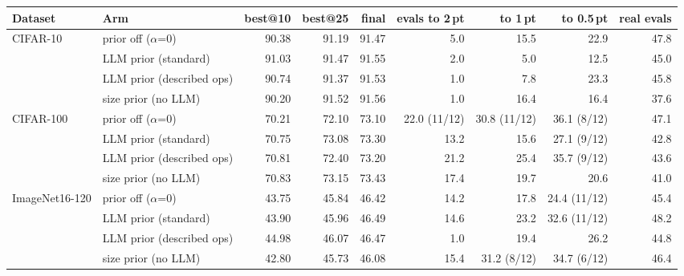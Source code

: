 \begin{tabular}{@{}llrrrrrrr@{}}
\toprule
Dataset & Arm & best@10 & best@25 & final & evals to 2\,pt & to 1\,pt & to 0.5\,pt & real evals\\
\midrule
CIFAR-10 & prior off ($\alpha$=0) & 90.38 & 91.19 & 91.47 & 5.0 & 15.5 & 22.9 & 47.8\\
 & LLM prior (standard) & 91.03 & 91.47 & 91.55 & 2.0 & 5.0 & 12.5 & 45.0\\
 & LLM prior (described ops) & 90.74 & 91.37 & 91.53 & 1.0 & 7.8 & 23.3 & 45.8\\
 & size prior (no LLM) & 90.20 & 91.52 & 91.56 & 1.0 & 16.4 & 16.4 & 37.6\\
\midrule
CIFAR-100 & prior off ($\alpha$=0) & 70.21 & 72.10 & 73.10 & 22.0 (11/12) & 30.8 (11/12) & 36.1 (8/12) & 47.1\\
 & LLM prior (standard) & 70.75 & 73.08 & 73.30 & 13.2 & 15.6 & 27.1 (9/12) & 42.8\\
 & LLM prior (described ops) & 70.81 & 72.40 & 73.20 & 21.2 & 25.4 & 35.7 (9/12) & 43.6\\
 & size prior (no LLM) & 70.83 & 73.15 & 73.43 & 17.4 & 19.7 & 20.6 & 41.0\\
\midrule
ImageNet16-120 & prior off ($\alpha$=0) & 43.75 & 45.84 & 46.42 & 14.2 & 17.8 & 24.4 (11/12) & 45.4\\
 & LLM prior (standard) & 43.90 & 45.96 & 46.49 & 14.6 & 23.2 & 32.6 (11/12) & 48.2\\
 & LLM prior (described ops) & 44.98 & 46.07 & 46.47 & 1.0 & 19.4 & 26.2 & 44.8\\
 & size prior (no LLM) & 42.80 & 45.73 & 46.08 & 15.4 & 31.2 (8/12) & 34.7 (6/12) & 46.4\\
\bottomrule
\end{tabular}
